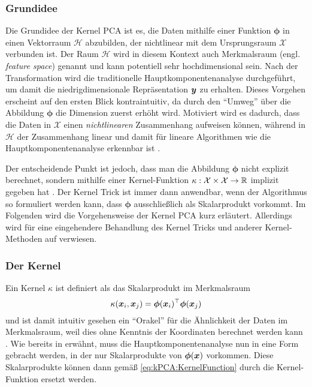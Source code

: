 \subsubsection{Grundidee}
\label{ch:MethodenDerDimRed:statistisch:kPCA:Grundidee}

Die Grundidee der Kernel PCA ist es, die Daten mithilfe einer Funktion $\bm{\phi}$ in einen
Vektorraum $\mathcal{H}$ abzubilden, der nichtlinear mit dem Ursprungsraum $\mathcal{X}$ verbunden
ist. Der Raum $\mathcal{H}$ wird in diesem Kontext auch Merkmalsraum (engl. \textit{feature space})
genannt und kann potentiell sehr hochdimensional sein. Nach der Transformation wird die
traditionelle Hauptkomponentenanalyse durchgeführt, um damit die niedrigdimensionale Repräsentation
$\bm{y}$ zu erhalten. Dieses Vorgehen erscheint auf den ersten Blick kontraintuitiv, da durch
den \enquote{Umweg} über die Abbildung $\bm{\phi}$ die Dimension zuerst erhöht wird. Motiviert wird
es dadurch, dass die Daten in $\mathcal{X}$ einen \textit{nichtlinearen} Zusammenhang aufweisen
können, während in $\mathcal{H}$ der Zusammenhang linear und damit für lineare Algorithmen wie die
Hauptkomponentenanalyse erkennbar ist \parencite[vgl.][26]{ShaweTaylor.2011}.

Der entscheidende Punkt ist jedoch, dass man die Abbildung $\bm{\phi}$ nicht explizit berechnet,
sondern mithilfe einer Kernel-Funktion $\kappa: \mathcal{X} \times \mathcal{X} \rightarrow \mathbb{R}$
implizit gegeben hat \parencites[586 -- 588]{Bishop.2006}[583]{Scholkopf.1997}. Der Kernel Trick ist immer dann anwendbar,
wenn der Algorithmus so formuliert werden kann, dass $\bm{\phi}$ ausschließlich als Skalarprodukt
vorkommt. Im Folgenden wird die Vorgehensweise der Kernel PCA kurz erläutert. Allerdings wird für
eine eingehendere Behandlung des Kernel Tricks und anderer Kernel-Methoden auf
\textcite{ShaweTaylor.2011} verwiesen.

\subsubsection{Der Kernel}
\label{ch:MethodenDerDimRed:statistisch:kPCA:KernelFunktion}

Ein Kernel $\kappa$ ist definiert als das Skalarprodukt im Merkmalsraum \parencite[34]{ShaweTaylor.2011}
\begin{equation}
	\label{eq:kPCA:KernelFunction}
	\kappa(\bm{x}_i, \bm{x}_j) = \bm{\phi}(\bm{x}_i)^\top \bm{\phi}(\bm{x}_j)
\end{equation}
und ist damit intuitiv gesehen ein \enquote{Orakel} für die Ähnlichkeit der Daten im Merkmalsraum, weil dies ohne Kenntnis der Koordinaten berechnet werden kann \parencite[71]{ShaweTaylor.2011}. Wie bereits in
 erwähnt, muss die
Hauptkomponentenanalyse nun in eine Form gebracht werden, in der nur Skalarprodukte von
$\bm{\phi}(\bm{x})$ vorkommen. Diese Skalarprodukte können dann gemäß
\eqref{eq:kPCA:KernelFunction} durch die Kernel-Funktion ersetzt werden.

